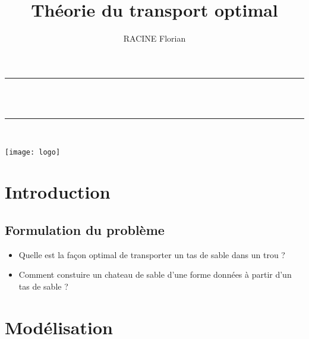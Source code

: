 \documentclass[11pt, a4paper]{article}
\author{RACINE Florian}
\title{Théorie du transport optimal}
\newcommand{\HRule}{\rule{\linewidth}{0.5mm}}
\begin{document}
\maketitle %
\begin{center}
\HRule \\[0.4cm]
{ \huge \bfseries \thetitle \\[0.4cm] }
\HRule \\[2cm]
\graphicspath{{/home/evo/Pictures/logo/}}
\texttt{[image: logo]}
\end{center}
\newpage

\tableofcontents
\newpage

\graphicspath{{image/}} %

\section{Introduction}

\subsection{Formulation du problème}

\begin{itemize}
    \item Quelle est la façon optimal de transporter un tas de sable dans un trou ?
    \item Comment constuire un chateau de sable d'une forme données à partir d'un tas de sable ?        
\end{itemize}

\section{Modélisation}
\end{document}
